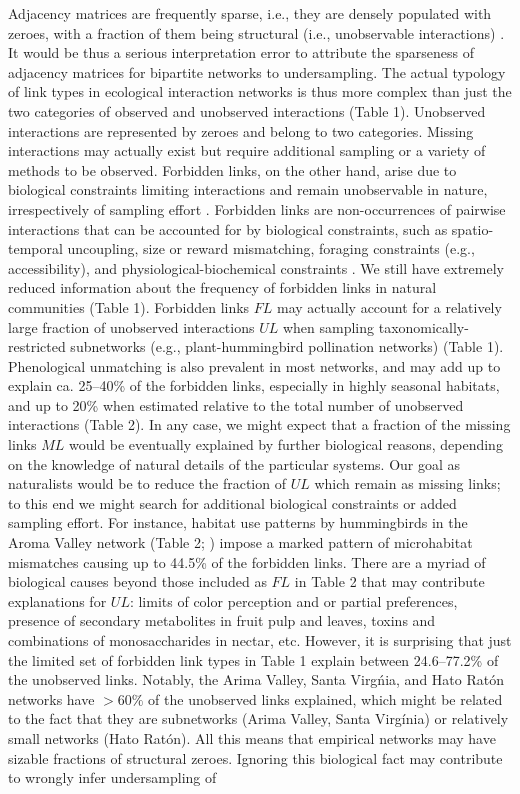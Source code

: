 \documentclass[12pt]{article}
\begin{document}
Adjacency matrices are frequently sparse, i.e., they are densely populated with zeroes, with a fraction of them being structural (i.e., unobservable interactions) \citep{Bascompte:2014to}. It would be thus a serious interpretation error to attribute the sparseness of adjacency matrices for bipartite networks to undersampling. The actual typology of link types in ecological interaction networks is thus more complex than just the two categories of observed and unobserved interactions (Table 1). Unobserved interactions are represented by zeroes and belong to two categories. Missing interactions may actually exist but require additional sampling or a variety of methods to be observed. Forbidden links, on the other hand, arise due to biological constraints limiting interactions and remain unobservable in nature, irrespectively of sampling effort \citep{E31.7324_PDF,Olesen:2011a}. Forbidden links are non-occurrences of pairwise interactions that can be accounted for by biological constraints, such as spatio-temporal uncoupling, size or reward mismatching, foraging constraints (e.g., accessibility), and physiological-biochemical constraints \citep{E31/2562}. We still have extremely reduced information about the frequency of forbidden links in natural communities \citep{E31.7324_PDF,Stang:2009cx,Vazquez:2009p82,Olesen:2011a,Ibanez:2012eu,Maruyama:2014gt,Vizentin-Bugoni:2014hc} (Table 1). Forbidden links $FL$ may actually account for a relatively large fraction of unobserved interactions $UL$ when sampling taxonomically-restricted subnetworks (e.g., plant-hummingbird pollination networks) (Table 1). Phenological unmatching is also prevalent in most networks, and may add up to explain ca. 25--40\% of the forbidden links, especially in highly seasonal habitats, and up to 20\% when estimated relative to the total number of unobserved interactions (Table 2). In any case, we might expect that a fraction of the missing links $ML$ would be eventually explained by further biological reasons, depending on the knowledge of natural details of the particular systems. Our goal as naturalists would be to reduce the fraction of $UL$ which remain as missing links; to this end we might search for additional biological constraints or added sampling effort. For instance, habitat use patterns by hummingbirds in the Aroma Valley network (Table 2; \citep{E31.616}) impose a marked pattern of microhabitat mismatches causing up to 44.5\% of the forbidden links. There are a myriad of biological causes beyond those included as $FL$ in Table 2 that may contribute explanations for $UL$: limits of color perception and or partial preferences, presence of secondary metabolites in fruit pulp and leaves, toxins and combinations of monosaccharides in nectar, etc. However, it is surprising that just the limited set of forbidden link types in Table 1 explain between 24.6--77.2\% of the unobserved links. Notably, the Arima Valley, Santa Virg\'nia, and Hato Rat\'on networks have $>60\%$ of the unobserved links explained, which might be related to the fact that they are subnetworks (Arima Valley, Santa Virg\'inia) or relatively small networks (Hato Rat\'on). All this means that empirical networks may have sizable fractions of structural zeroes. Ignoring this biological fact may contribute to wrongly infer undersampling of 
\end{document}
